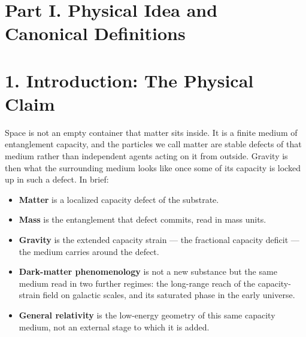 \documentclass[11pt]{article}
\begin{document}
\begin{abstract}
\indent We also test the cell model in a computer simulation of dynamical spacetime. Turning on the medium's weighting leaves the background geometry undisturbed, as required. Defects then strain nearby capacity and deform the local geometry, while a scrambled control does not. A predicted shift of the host geometry follows the cell model across a family of simulation settings, and the control follows its own distinct prediction. These tests are still limited in scale, but they connect the proposed medium to a dynamical geometry through measured consequences rather than analogy alone.

\indent Beyond ordinary weak gravity, the framework extends to time-dependent transport, clusters, cosmology, the saturated early universe, black holes, and particle structure at explicitly labeled levels of closure. The finite marked-transfer and charged-lepton calculation is closed inside its displayed action. Its embedding in a stable geometric condensate, together with the transverse, cosmological, and strong-field completions, remains conditional or open as stated in the closure table.
\end{abstract}

\clearpage
\tableofcontents
\newpage

\section*{Part I. Physical Idea and Canonical Definitions}

\section{1. Introduction: The Physical Claim}

Space is not an empty container that matter sits inside. It is a finite medium of entanglement capacity, and the particles we call matter are stable defects of that medium rather than independent agents acting on it from outside. Gravity is then what the surrounding medium looks like once some of its capacity is locked up in such a defect. In brief:
\begin{itemize}
\item \textbf{Matter} is a localized capacity defect of the substrate.
\item \textbf{Mass} is the entanglement that defect commits, read in mass units.
\item \textbf{Gravity} is the extended capacity strain --- the fractional capacity deficit --- the medium carries around the defect.
\item \textbf{Dark-matter phenomenology} is not a new substance but the same medium read in two further regimes: the long-range reach of the capacity-strain field on galactic scales, and its saturated phase in the early universe.
\item \textbf{General relativity} is the low-energy geometry of this same capacity medium, not an external stage to which it is added.
\end{itemize}
\end{document}
